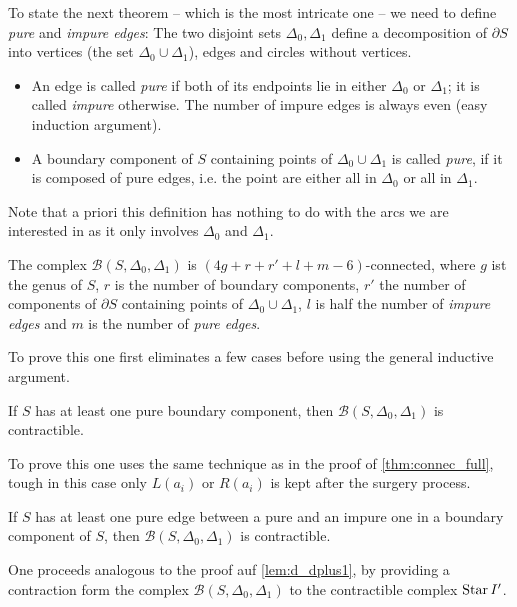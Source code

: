 To state the next theorem -- which is the most intricate one -- we need to define \emph{pure} and \emph{impure edges}:
The two disjoint sets $\Delta_0, \Delta_1$ define a decomposition of $\partial S$ into vertices (the set $\Delta_0 \cup \Delta_1$), edges and circles without vertices.
\begin{itemize}
	\item An edge is called \emph{pure} if both of its endpoints lie in either $\Delta_0$ or $\Delta_1$; it is called \emph{impure} otherwise.
	The number of impure edges is always even (easy induction argument).
	\item A boundary component of $S$ containing points of $\Delta_0 \cup \Delta_1$ is called \emph{pure}, if it is composed of pure edges, i.e. the point are either all in $\Delta_0$ or all in $\Delta_1$.
\end{itemize}


Note that a priori this definition has nothing to do with the arcs we are interested in as it only involves $\Delta_0$ and $\Delta_1$. 

\begin{theorem}
	The complex $\mathcal{B}(S,\Delta_0,\Delta_1)$ is $(4g +r +r ' +l +m -6)$-connected, where $g$ ist the genus of $S$, $r$ is the number of boundary components, $r'$ the number of components of $\partial S$ containing points of $\Delta_0 \cup \Delta_1$, $l$ is half the number of \emph{impure edges} and $m$ is the number of \emph{pure edges}.
\end{theorem}

To prove this one first eliminates a few cases before using the general inductive argument.


\begin{lemma}[label=lem:44]
	If $S$ has at least one pure boundary component, then $\mathcal{B}(S,\Delta_0,\Delta_1)$ is contractible.
\end{lemma}

To prove this one uses the same technique as in the proof of \autoref{thm:connec_full}, tough in this case only $L(a_i)$ or $R(a_i)$ is kept after the surgery process.

\begin{lemma}[label=lem:45]
	If $S$ has at least one pure edge between a pure and an impure one in a boundary component of $S$, then $\mathcal{B}(S,\Delta_0,\Delta_1)$ is contractible.
\end{lemma}

One proceeds analogous to the proof auf \autoref{lem:d_dplus1}, by providing a contraction form the complex $\mathcal{B}(S,\Delta_0,\Delta_1)$ to the contractible complex $\operatorname{Star}{I'}$.

